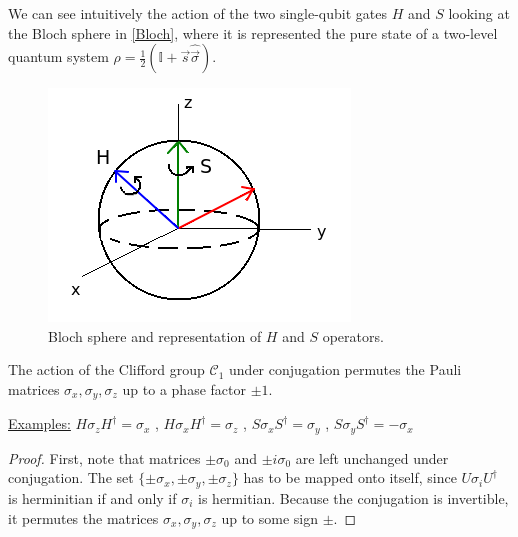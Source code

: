 \documentclass[10pt,a4paper]{book}
\numberwithin{equation}{chapter}
\numberwithin{figure}{chapter}
\numberwithin{table}{chapter}
\begin{document}
We can see intuitively the action of the two single-qubit gates $H$ and $S$ looking at the Bloch sphere in \autoref{Bloch}, where it is represented the pure state of a two-level quantum system $\rho=\frac{1}{2}(\mathbb{I}+\vec{s}\hat{\vec{\sigma}})$.
\begin{figure}[H]
    \begin{center}
        \includegraphics[scale=0.6]{BlochSphere.png}
    \end{center}
    \caption{\footnotesize Bloch sphere and representation of $H$ and $S$ operators.}
    \label{Bloch}
\end{figure}
The action of the Clifford group $\mathcal{C}_1$ under conjugation permutes the Pauli matrices $\sigma_x ,\sigma_y , \sigma_z$ up to a phase factor $\pm 1$.

\underline{Examples:} $H\sigma_{z}H^{\dagger}=\sigma_{x}$ , $H\sigma_{x}H^{\dagger}=\sigma_{z}$ , $S\sigma_{x}S^{\dagger}=\sigma_{y}$ , $S\sigma_{y}S^{\dagger}=-\sigma_{x}$
\begin{proof}
First, note that matrices $\pm \sigma_0$ and $\pm i\sigma_0$ are left unchanged under conjugation. The set $\lbrace \pm \sigma_x ,\pm\sigma_y ,\pm \sigma_z\rbrace$ has to be mapped onto itself, since $U\sigma_i U^{\dagger}$ is herminitian if and only if $\sigma_i$ is hermitian. Because the conjugation is invertible, it permutes the matrices $\sigma_x ,\sigma_y , \sigma_z$ up to some sign $\pm$. 
\end{proof}
\end{document}

